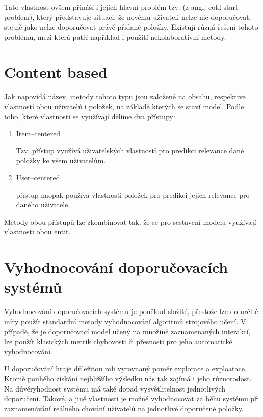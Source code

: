 \documentclass[thesis=M,czech]{FITthesis}[2019/12/23]
\begin{document}
Tato vlastnost ovšem přináší i jejich hlavní problém tzv.  (z angl. cold start problem), který představuje situaci, že novému uživateli nelze nic doporučovat, stejně jako nelze doporučovat právě přidané položky. Existují různá řešení tohoto problému, mezi která patří například i použití nekolaborativní metody.

\section{Content based}
\label{sec:contentbased}

Jak napovídá název, metody tohoto typu jsou založené na obsahu, respektive vlastností obou uživatelů i položek, na základě kterých se staví model. Podle toho, které vlastnosti se využívají dělíme dva přístupy:
\begin{enumerate}
    \item Item--centered
    
    Tzv.  přístup využívá uživatelských vlastností pro predikci relevance dané položky ke všem uživatelům.
    
    \item User--centered
    
     přístup naopak používá vlastnosti položek pro predikci jejich relevance pro daného uživatele.
    
\end{enumerate}

Metody obou přístupů lze zkombinovat tak, že se pro sestavení modelu využívají vlastnosti obou entit.

\section{Vyhodnocování doporučovacích systémů}

Vyhodnocování doporučovacích systémů je poněkud složité, přestože lze do určité míry použít standardní metody vyhodnocování algoritmů strojového učení. V případě, že je doporučovací model učený na množině zaznamenaných interakcí, lze použít klasických metrik chybovosti či přesnosti pro jeho automatické vyhodnocování.

U doporučování hraje důležitou roli vyrovnaný poměr explorace a exploatace. Kromě pouhého získání nejbližšího výsledku nás tak zajímá i jeho různorodost. Na důvěryhodnost systému má také dopad vysvětlitelnost jednotlivých doporučení. Takové, a jiné vlastnosti je možné vyhodnocovat za běhu systému při zaznamenávání reálného chování uživatelů na jednotlivé doporučené položky.
\newpage
\end{document}
